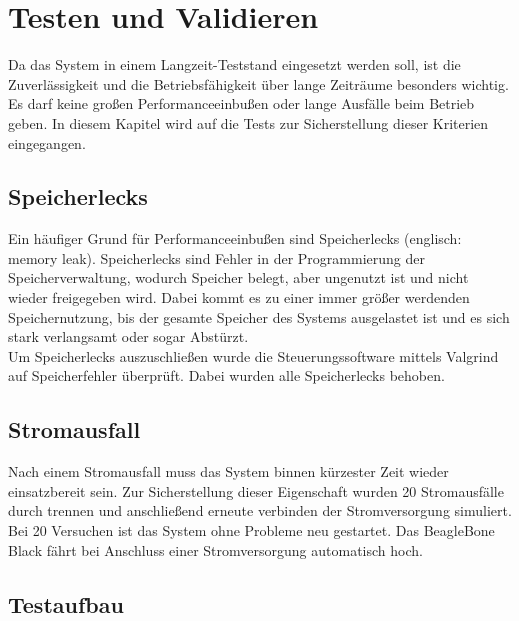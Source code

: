
\chapter{Testen und Validieren}
\label{chapter_Testen_und_Validieren}

Da das System in einem Langzeit-Teststand eingesetzt werden soll, ist die Zuverlässigkeit und die Betriebsfähigkeit über lange Zeiträume besonders wichtig. Es darf keine großen Performanceeinbußen oder lange Ausfälle beim Betrieb geben. In diesem Kapitel wird auf die Tests zur Sicherstellung dieser Kriterien eingegangen.

\section{Speicherlecks}

Ein häufiger Grund für Performanceeinbußen sind Speicherlecks (englisch: memory leak). Speicherlecks sind Fehler in der Programmierung der Speicherverwaltung, wodurch Speicher belegt, aber ungenutzt ist und nicht wieder freigegeben wird. Dabei kommt es zu einer immer größer werdenden Speichernutzung, bis der gesamte Speicher des Systems ausgelastet ist und es sich stark verlangsamt oder sogar Abstürzt.\\
Um Speicherlecks auszuschließen wurde die Steuerungssoftware mittels Valgrind \cite{valgrind} auf Speicherfehler überprüft. Dabei wurden alle Speicherlecks behoben.\\

\section{Stromausfall}

Nach einem Stromausfall muss das System binnen kürzester Zeit wieder einsatzbereit sein. Zur Sicherstellung dieser Eigenschaft wurden 20 Stromausfälle durch trennen und anschließend erneute verbinden der Stromversorgung simuliert.\\
Bei 20 Versuchen ist das System ohne Probleme neu gestartet. Das BeagleBone Black fährt bei Anschluss einer Stromversorgung automatisch hoch.

\section{Testaufbau}

